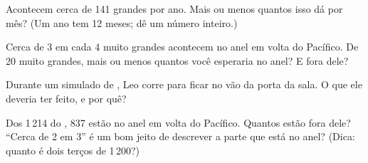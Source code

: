 \begin{exercise}[$\star\star$]\label{exo:g4:volcanoes-earthquakes-first-look:8}
Acontecem cerca de 141  grandes por ano. Mais ou menos quantos
isso dá por mês? (Um ano tem 12 meses; dê um número inteiro.)
\end{exercise}

\begin{exercise}[$\star\star$]\label{exo:g4:volcanoes-earthquakes-first-look:9}
Cerca de 3 em cada 4  muito grandes acontecem no anel em volta do
Pacífico. De 20  muito grandes, mais ou menos quantos você
esperaria no anel? E fora dele?
\end{exercise}

\begin{exercise}[$\star\star$]\label{exo:g4:volcanoes-earthquakes-first-look:10}
Durante um simulado de , Leo corre para ficar no vão da porta da
sala. O que ele deveria ter feito, e por quê?
\end{exercise}

\begin{exercise}[$\star\star\star$]\label{exo:g4:volcanoes-earthquakes-first-look:11}
Dos 1\,214  do , 837 estão no anel em volta do Pacífico. Quantos
estão fora dele? ``Cerca de 2 em 3'' é um bom jeito de descrever a parte
que está no anel? (Dica: quanto é dois terços de 1\,200?)
\end{exercise}
